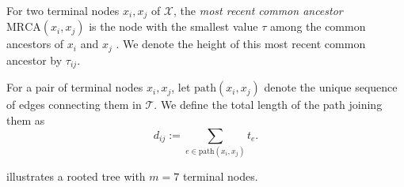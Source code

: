 \begin{definition}\label{def:mrca} For two terminal nodes $x_i, x_j$ of $\mathcal{X}$, the \emph{most recent common ancestor} $\mathrm{MRCA}(x_i,x_j)$ is the node with the smallest value $\tau$ among the common ancestors of $x_i$ and $x_j$ \cite{semple2003phylogenetics}. We denote the height of this most recent common ancestor by $\tau_{ij}$.
\end{definition}
\noindent For a pair of terminal nodes $x_i, x_j$, let $\mathrm{path}(x_i,x_j)$ denote the unique sequence of edges connecting them in $\mathcal{T}$. We define the total length of the path joining them as
\begin{equation}\label{eq:path_length}
d_{ij} := \sum_{e \in \mathrm{path}(x_i,x_j)} t_e .
\end{equation}

 illustrates a rooted tree with $m = 7$ terminal nodes.



